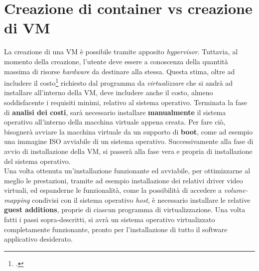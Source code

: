 

\section{Creazione di container vs creazione di VM}

La creazione di una VM è possibile tramite apposito \textit{hypervisor}. Tuttavia, al momento della creazione, l'utente deve essere a conoscenza della quantità massima di risorse \textit{hardware} da destinare alla stessa. Questa stima, oltre ad includere il costo\footcite{inteso come quantitativo di risorse fisiche da allocare} richiesto dal programma da \textit{virtualizzare} che si andrà ad installare all'interno della VM, deve includere anche il costo, almeno soddisfacente i requisiti minimi, relativo al sistema operativo. 
Terminata la fase di \textbf{analisi dei costi}, sarà necessario installare \textbf{manualmente} il sistema operativo all'interno della macchina virtuale appena creata. Per fare ciò, bisognerà avviare la macchina virtuale da un supporto di \textbf{boot}, come ad esempio una immagine \gls{ISO} avviabile di un sistema operativo.
Successivamente alla fase di avvio di installazione della VM, si passerà alla fase vera e propria di installazione del sistema operativo.\\%
Una volta ottenuta un'installazione funzionante ed avviabile, per ottimizzarne al meglio le prestazioni, tramite ad esempio installazione dei relativi \gls{driver} video virtuali, ed espanderne le funzionalità, come la possibilità di accedere a \textit{volume-mapping} condivisi con il sistema operativo \textit{host}, è necessario installare le relative \textbf{\gls{guest additions}}, proprie di ciascun programma di virtualizzazione.
Una volta fatti i passi sopra-descritti, si avrà un sistema operativo virtualizzato completamente funzionante, pronto per l'installazione di tutto il software applicativo desiderato.
\\
